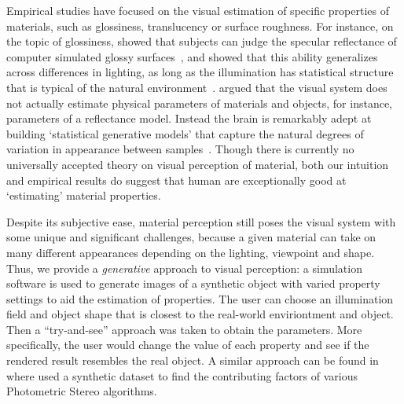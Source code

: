 Empirical studies have focused on the visual estimation of specific properties of materials, such as glossiness, translucency or surface roughness. For instance, on the topic of glossiness, \citeauthor{nishida1998use} showed that subjects can judge the specular reflectance of computer simulated glossy surfaces~\cite{nishida1998use}, and \citeauthor{fleming2003real} showed that this ability generalizes across differences in lighting, as long as the illumination has statistical structure that is typical of the natural environment~\cite{fleming2003real}. \citeauthor{fleming2014visual} argued that the visual system does not actually estimate physical parameters of materials and objects, for instance, parameters of a reflectance model. Instead the brain is remarkably adept at building `statistical generative models' that capture the natural degrees of variation in appearance between samples~\cite{fleming2014visual}. Though there is currently no universally accepted theory on visual perception of material, both our intuition and empirical results do suggest that human are exceptionally good at `estimating' material properties.

Despite its subjective ease, material perception still poses the visual system with some unique and significant challenges, because a given material can take on many different appearances depending on the lighting, viewpoint and shape. Thus, we provide a \textit{generative} approach to visual perception: a simulation software is used to generate images of a synthetic object with varied property settings to aid the estimation of properties. The user can choose an illumination field and object shape that is closest to the real-world enviriontment and object. Then a ``try-and-see'' approach was taken to obtain the parameters. More specifically, the user would change the value of each property and see if the rendered result resembles the real object. A similar approach can be found in~\cite{Berkiten:2016:ARB} where \citeauthor{Berkiten:2016:ARB} used a synthetic dataset to find the contributing factors of various Photometric Stereo algorithms.

